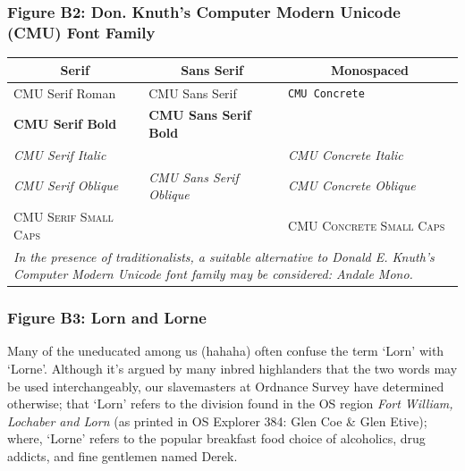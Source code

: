 \documentclass[11pt, english]{article}
\begin{document}
		\subsubsection*{Figure B2: Don. Knuth's Computer Modern Unicode (CMU) Font Family}

		\begin{table}[h]
			\scriptsize
			\renewcommand{\arraystretch}{1.25}
		\begin{center}
		\begin{tabular}{p{4cm}p{4cm}p{4cm}}
			\hline
			\multicolumn{1}{c}{\textbf{Serif}} & \multicolumn{1}{c}{\textbf{Sans Serif}} & \multicolumn{1}{c}{\textbf{Monospaced}}\\
			\hline
			CMU Serif Roman & \textsf{CMU Sans Serif} & \texttt{CMU Concrete}\\
			\textbf{CMU Serif Bold} & \sffamily \textbf{CMU Sans Serif Bold} & \\ 
				\textit{CMU Serif Italic} & & \ttfamily \textit{CMU Concrete Italic}\\
			\textsl{CMU Serif Oblique} & \sffamily \textsl{CMU Sans Serif Oblique} & \ttfamily \textsl{CMU Concrete Oblique}\\
				\textsc{CMU Serif Small Caps} & & \ttfamily \textsc{CMU Concrete Small Caps}\\
			\hline
				\multicolumn{3}{p{13cm}}{\textit{In the presence of traditionalists, a suitable alternative to Donald E. Knuth's Computer Modern Unicode font family may be considered: Andale Mono.}}\\
			\hline
		\end{tabular}
		\end{center}
		\end{table}

\newpage

		\subsubsection*{Figure B3: Lorn and Lorne}

		Many of the uneducated among us (hahaha) often confuse the term `Lorn' with `Lorne'. Although it's argued by many inbred highlanders that the two words may be used interchangeably, our slavemasters at Ordnance Survey have determined otherwise; that `Lorn' refers to the division found in the OS region \textit{Fort William, Lochaber and Lorn} (as printed in OS Explorer 384: Glen Coe \& Glen Etive); where, `Lorne' refers to the popular breakfast food choice of alcoholics, drug addicts, and fine gentlemen named Derek.\\
\end{document}
